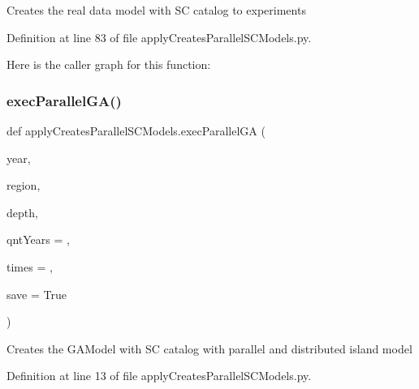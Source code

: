 \begin{DoxyVerb}Creates the real data model with SC catalog to experiments
\end{DoxyVerb}
 

Definition at line 83 of file apply\+Creates\+Parallel\+S\+C\+Models.\+py.

Here is the caller graph for this function\+:
\mbox{\label{namespaceapply_creates_parallel_s_c_models_a73b756dca0cad3be956ad0396c73d9c7}} 
\subsubsection{\texorpdfstring{exec\+Parallel\+G\+A()}{execParallelGA()}}
{\footnotesize\ttfamily def apply\+Creates\+Parallel\+S\+C\+Models.\+exec\+Parallel\+GA (\begin{DoxyParamCaption}\item[{}]{year,  }\item[{}]{region,  }\item[{}]{depth,  }\item[{}]{qnt\+Years = {},  }\item[{}]{times = {},  }\item[{}]{save = {\ttfamily True} }\end{DoxyParamCaption})}

\begin{DoxyVerb}Creates the GAModel with SC catalog with parallel and distributed island model
\end{DoxyVerb}
 

Definition at line 13 of file apply\+Creates\+Parallel\+S\+C\+Models.\+py.

\mbox{\label{namespaceapply_creates_parallel_s_c_models_ac38a792ad866daa58851372e337ecdcb}} 
